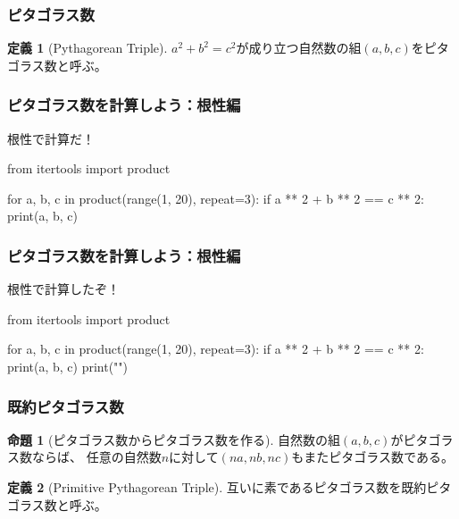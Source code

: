 \documentclass[dvipdfmx,11pt,notheorems]{beamer}
\theoremstyle{definition}
\newtheorem{definition}{定義}
\newtheorem{proposition}{命題}
\begin{document}
\begin{frame}\frametitle{ピタゴラス数}

\begin{definition}[Pythagorean Triple]
$a^{2} + b^{2} = c^{2}$が成り立つ自然数の組$(a, b, c)$をピタゴラス数と呼ぶ。
\end{definition}

\end{frame}

\begin{frame}[fragile]\frametitle{ピタゴラス数を計算しよう：根性編}

\begin{block}{根性で計算だ！}
\begin{pyverbatim}
from itertools import product

for a, b, c in product(range(1, 20), repeat=3):
    if a ** 2 + b ** 2 == c ** 2:
        print(a, b, c)
\end{pyverbatim}
\end{block}

\end{frame}

\begin{frame}[fragile]\frametitle{ピタゴラス数を計算しよう：根性編}

\begin{block}{根性で計算したぞ！}
\begin{pycode}
from itertools import product

for a, b, c in product(range(1, 20), repeat=3):
    if a ** 2 + b ** 2 == c ** 2:
        print(a, b, c)
        print("\n")
\end{pycode}
\end{block}

\end{frame}

\begin{frame}\frametitle{既約ピタゴラス数}

\begin{proposition}[ピタゴラス数からピタゴラス数を作る]
自然数の組$(a, b, c)$がピタゴラス数ならば、
任意の自然数$n$に対して$(na, nb, nc)$もまたピタゴラス数である。
\end{proposition}

\begin{definition}[Primitive Pythagorean Triple]
互いに素であるピタゴラス数を既約ピタゴラス数と呼ぶ。
\end{definition}

\end{frame}
\end{document}
